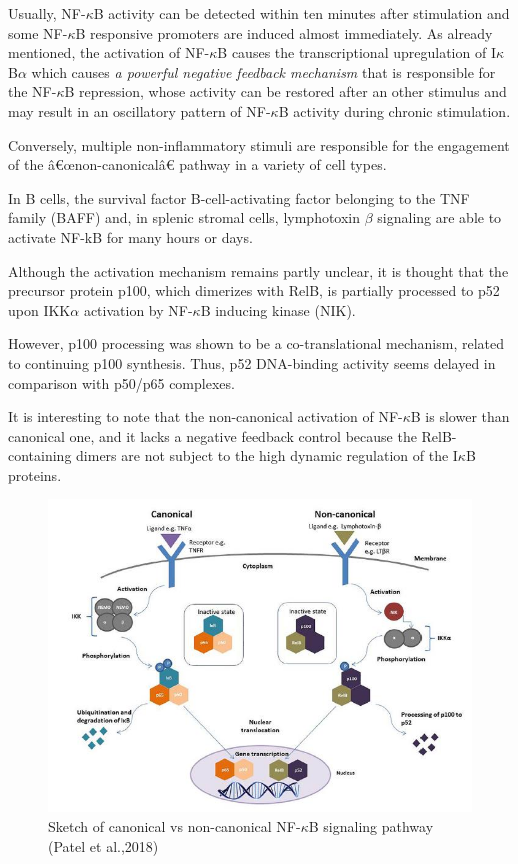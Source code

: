 \documentclass[12pt,a4paper]{report}
\begin{document}
Usually, NF-$\kappa$B activity can be detected within ten minutes after stimulation and some NF-$\kappa$B responsive promoters are induced almost immediately. As already mentioned, the activation of NF-$\kappa$B causes the transcriptional upregulation of I$\kappa$B$\alpha$ which causes \emph{a powerful negative feedback mechanism} that is responsible for the NF-$\kappa$B repression, whose activity can be restored after an other stimulus and may result in an oscillatory pattern of NF-$\kappa$B activity during chronic stimulation.

Conversely, multiple non-inflammatory stimuli are responsible for the engagement of the â€œnon-canonicalâ€ pathway in a variety of cell types.

In B cells, the survival factor B-cell-activating factor belonging to the TNF family (BAFF) and, in splenic stromal cells, lymphotoxin $\beta$ signaling are able to activate NF-kB for many hours or days.

Although the activation mechanism remains partly unclear, it is thought that the precursor protein p100, which dimerizes with RelB, is partially processed to p52 upon IKK$\alpha$ activation by NF-$\kappa$B inducing kinase (NIK).

However, p100 processing was shown to be a co-translational mechanism, related to continuing p100 synthesis. Thus, p52 DNA-binding activity seems
delayed in comparison with p50/p65 complexes.

It is interesting to note that the non-canonical activation of NF-$\kappa$B is slower than canonical one, and it lacks a negative feedback control because the RelB-containing dimers are not subject to the high dynamic regulation of the I$\kappa$B proteins.

\begin{figure}[!ht]
\hspace*{-1cm} 
\includegraphics[scale=0.70]{canonicalvsnoncanonicalpathway.png}
\caption{Sketch of canonical vs non-canonical NF-$\kappa$B signaling pathway (Patel et al.,2018)}
\label{canonicalvsnoncanonicalpathway}
\end{figure}
\newpage
\end{document}
